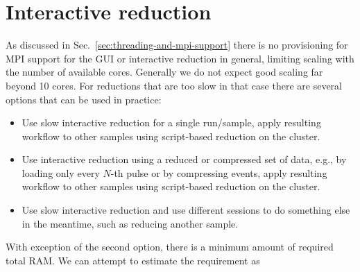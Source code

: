 \documentclass[a4paper,english,numbers=noenddot,bibliography=totoc,chapterprefix=on,DIV=12]{scrartcl}
\begin{document}
\section{Interactive reduction}

As discussed in Sec.~\ref{sec:threading-and-mpi-support} there is no provisioning for MPI support for the GUI or interactive reduction in general, limiting scaling with the number of available cores.
Generally we do not expect good scaling far beyond 10 cores.
For reductions that are too slow in that case there are several options that can be used in practice:
\begin{itemize}
  \item Use slow interactive reduction for a single run/sample, apply resulting workflow to other samples using script-based reduction on the cluster.
  \item Use interactive reduction using a reduced or compressed set of data, e.g., by loading only every $N$-th pulse or by compressing events, apply resulting workflow to other samples using script-based reduction on the cluster.
  \item Use slow interactive reduction and use different sessions to do something else in the meantime, such as reducing another sample.
\end{itemize}
With exception of the second option, there is a minimum amount of required total RAM.
We can attempt to estimate the requirement as
\end{document}
